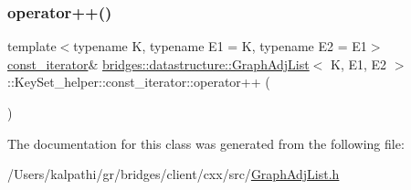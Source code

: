 \subsubsection{\texorpdfstring{operator++()}{operator++()}}
{\footnotesize\ttfamily template$<$typename K, typename E1 = K, typename E2 = E1$>$ \\
\mbox{\hyperlink{classbridges_1_1datastructure_1_1_graph_adj_list_1_1_key_set__helper_1_1const__iterator}{const\+\_\+iterator}}\& \mbox{\hyperlink{classbridges_1_1datastructure_1_1_graph_adj_list}{bridges\+::datastructure\+::\+Graph\+Adj\+List}}$<$ K, E1, E2 $>$\+::Key\+Set\+\_\+helper\+::const\+\_\+iterator\+::operator++ (\begin{DoxyParamCaption}{ }\end{DoxyParamCaption})\hspace{0.3cm}{\ttfamily [inline]}}



The documentation for this class was generated from the following file\+:\begin{DoxyCompactItemize}
\item 
/\+Users/kalpathi/gr/bridges/client/cxx/src/\mbox{\hyperlink{_graph_adj_list_8h}{Graph\+Adj\+List.\+h}}\end{DoxyCompactItemize}
